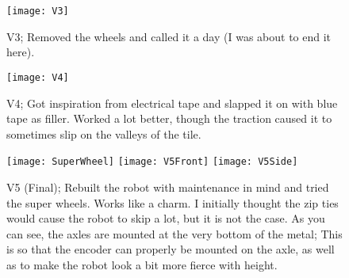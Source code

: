 \begin{figure}[h]
    \centering
    \texttt{[image: V3]}
    \caption{
        V3; Removed the wheels and called it a day (I was about to end it here).
    }
\end{figure}

\begin{figure}[h]
    \centering
    \texttt{[image: V4]}
    \caption{
        V4; Got inspiration from electrical tape and slapped it on with blue tape as filler. Worked a lot better, though the traction caused it to sometimes slip on the valleys of the tile.
    }
\end{figure}

\begin{figure}[h]
    \centering
    \texttt{[image: SuperWheel]}
    \texttt{[image: V5Front]}
    \texttt{[image: V5Side]}
    \caption{
        V5 (Final); Rebuilt the robot with maintenance in mind and tried the super wheels. Works like a charm. I initially thought the zip ties would cause the robot to skip a lot, but it is not the case. As you can see, the axles are mounted at the very bottom of the metal; This is so that the encoder can properly be mounted on the axle, as well as to make the robot look a bit more fierce with height.
    }
\end{figure}
